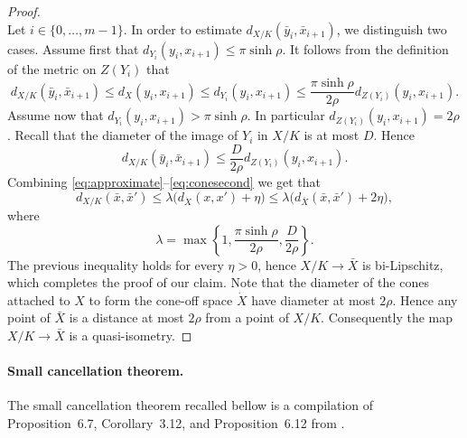 \begin{proof}
\begin{equation}
\end{equation}
Let $i\in\{0,\ldots,m-1\}$. In order to estimate $d_{X/K}(\bar y_i,\bar x_{i+1})$, we distinguish two cases. Assume first that $d_{Y_i}(y_i,x_{i+1})\leqslant\pi\sinh\rho$. It follows from the definition of the metric on $Z(Y_i)$ that
\begin{equation}\label{eq:conefirst}
d_{X/K}(\bar y_i,\bar x_{i+1})\leqslant d_X(y_i,x_{i+1})\leqslant d_{Y_i}(y_i,x_{i+1})\leqslant\frac{\pi\sinh\rho}{2\rho}d_{Z(Y_i)}(y_i,x_{i+1}).
\end{equation}
Assume now that $d_{Y_i}(y_i,x_{i+1})>\pi\sinh\rho$. In particular $d_{Z(Y_i)}(y_i,x_{i+1})=2\rho$. Recall that the diameter of the image of $Y_i$ in $X/K$ is at most $D$. Hence
\begin{equation}\label{eq:conesecond}
d_{X/K}(\bar y_i,\bar x_{i+1})\leqslant\frac{D}{2\rho}d_{Z(Y_i)}(y_i,x_{i+1}).
\end{equation}
Combining \eqref{eq:approximate}--\eqref{eq:conesecond} we get that
\[
d_{X/K}(\bar x,\bar x')\leqslant\lambda\bigl(d_{\dot X}(x,x')+\eta\bigr)\leqslant\lambda\bigl(d_{\bar X}(\bar x,\bar x')+2\eta\bigr),
\]
where
\[
\lambda=\max\left\{1,\frac{\pi\sinh\rho}{2\rho},\frac{D}{2\rho}\right\}.
\]
The previous inequality holds for every $\eta>0$, hence $X/K\to\bar X$ is bi-Lipschitz, which completes the proof of our claim. Note that the diameter of the cones attached to $X$ to form the cone-off space $\dot X$ have diameter at most $2\rho$. Hence any point of $\bar X$ is a distance at most $2\rho$ from a point of $X/K$. Consequently the map $X/K\to\bar X$ is a quasi-isometry.
\end{proof}

\paragraph*{Small cancellation theorem.}
The small cancellation theorem recalled bellow is a compilation of Proposition~6.7, Corollary~3.12, and Proposition~6.12 from \cite{ref06}.

